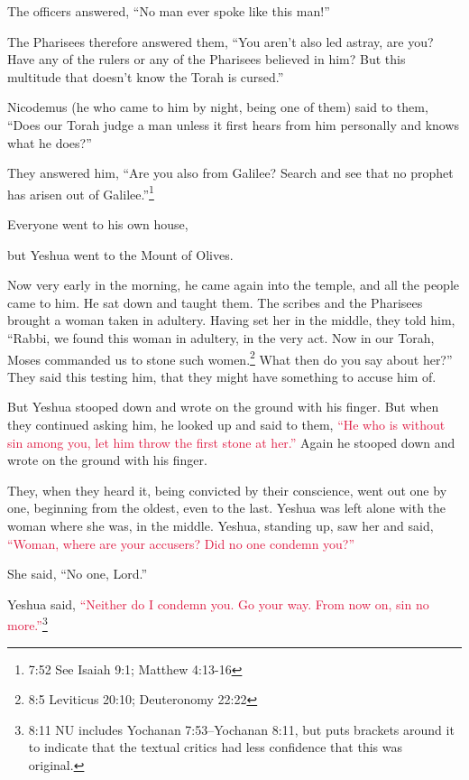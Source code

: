 \myverse{}The officers answered, “No man ever spoke like this man!”

\myverse{}The Pharisees therefore answered them, “You aren’t also led astray,
are you?
\myverse{}Have any of the rulers or any of the Pharisees believed in him?
\myverse{}But this multitude that doesn’t know the Torah is cursed.”

\myverse{}Nicodemus (he who came to him by night, being one of them) said
to them,
\myverse{}“Does our Torah judge a man unless it first hears from him personally and
knows what he does?”

\myverse{}They answered him, “Are you also from Galilee? Search and see
that no prophet has arisen out of Galilee.”\footnote{7:52 See
	Isaiah 9:1;
	Matthew 4:13-16}

\myverse{}Everyone went to his own house,

\mychapter{}\myverse*{}but Yeshua went to the Mount of Olives.

\myverse{}Now very early in the morning, he came again into the temple, and
all the people came to him. He sat down and taught them.
\myverse{}The scribes and the Pharisees brought a woman taken in adultery. Having set
her in the middle,
\myverse{}they told him, “Rabbi, we found this woman in adultery, in the very act.
\myverse{}Now in our Torah, Moses commanded us to stone such women.\footnote{8:5 Leviticus 20:10;
	Deuteronomy 22:22} What then do you say about her?”
\myverse{}They said this testing him, that they might have something to accuse him of.

But Yeshua stooped down and wrote on the ground with his finger.
\myverse{}But when they continued asking him, he looked up and said to them,
\textcolor{crimson}{“He who is without sin among you, let him throw the first stone at her.”
}
\myverse{}Again he stooped down and wrote on the ground with his finger.

\myverse{}They, when they heard it, being convicted by their conscience,
went out one by one, beginning from the oldest, even to the last. Yeshua was left alone with the woman
where she was, in the middle.
\myverse{}Yeshua, standing up, saw her and said,
\textcolor{crimson}{“Woman, where are your accusers? Did no one condemn you?”}

\myverse{}She said, “No one, Lord.”

Yeshua said,
\textcolor{crimson}{“Neither do I condemn you. Go your way. From now on, sin no more.”}\footnote{8:11 NU includes
	Yochanan 7:53–Yochanan 8:11, but puts brackets around
	it to indicate that the textual critics had less confidence that this was original.}

